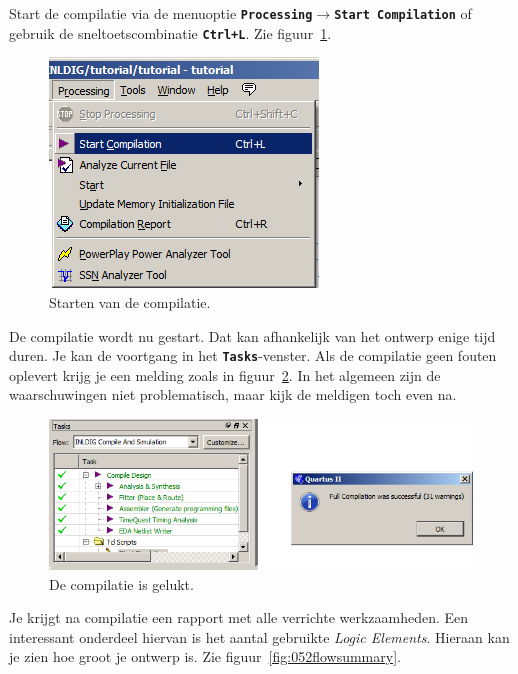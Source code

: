 \documentclass[a4paper,12pt,fleqn,twoside]{book}
\def\tutpicscale{0.455}
\newcommand{\menu}[1]{\texttt{\textbf{#1}}}
\newcommand{\knop}[1]{\texttt{\textbf{#1}}}
\def\pijl{$\rightarrow$}%
\begin{document}
Start de compilatie via de menuoptie \menu{Processing\pijl{}Start Compilation}
of gebruik de sneltoetscombinatie \knop{Ctrl+L}.
Zie figuur~\ref{fig:050startcompilation}.

\begin{figure}[H]
\centering
\includegraphics[scale=\tutpicscale]{050startcompilation}
\caption{Starten van de compilatie.}
\label{fig:050startcompilation}
\end{figure}

De compilatie wordt nu gestart. Dat kan afhankelijk van het ontwerp enige tijd
duren. Je kan de voortgang in het \menu{Tasks}-venster. Als de compilatie geen
fouten oplevert krijg je een melding zoals in
figuur~\ref{fig:051compilecomplete}. In het algemeen zijn de waarschuwingen niet
problematisch, maar kijk de meldigen toch even na.
 
\begin{figure}[H]
\centering
\includegraphics[scale=\tutpicscale]{051compilecomplete}
\caption{De compilatie is gelukt.}
\label{fig:051compilecomplete}
\end{figure}

Je krijgt na compilatie een rapport met alle verrichte werkzaamheden. Een
interessant onderdeel hiervan is het aantal gebruikte
\textsl{Logic Elements}. Hieraan kan je zien hoe groot je ontwerp is.
Zie figuur~\ref{fig:052flowsummary}.
\end{document}
